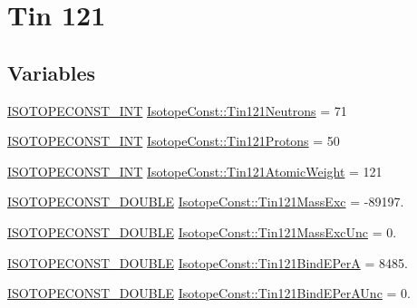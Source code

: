 \hypertarget{group___isotope_const-_tin-_sn121}{}\section{Tin 121}
\label{group___isotope_const-_tin-_sn121}
\subsection*{Variables}
\begin{DoxyCompactItemize}
\item 
\mbox{\hyperlink{group___isotope_const-_macros_ga5f18360b3e99483a35c32d789e62621c}{I\+S\+O\+T\+O\+P\+E\+C\+O\+N\+S\+T\+\_\+\+I\+NT}} \mbox{\hyperlink{group___isotope_const-_tin-_sn121_ga5b11585c595bc4a815949d5233c0fa2f}{Isotope\+Const\+::\+Tin121\+Neutrons}} = 71
\item 
\mbox{\hyperlink{group___isotope_const-_macros_ga5f18360b3e99483a35c32d789e62621c}{I\+S\+O\+T\+O\+P\+E\+C\+O\+N\+S\+T\+\_\+\+I\+NT}} \mbox{\hyperlink{group___isotope_const-_tin-_sn121_ga1c6d153b534ee6c444a997a4e7d7eef3}{Isotope\+Const\+::\+Tin121\+Protons}} = 50
\item 
\mbox{\hyperlink{group___isotope_const-_macros_ga5f18360b3e99483a35c32d789e62621c}{I\+S\+O\+T\+O\+P\+E\+C\+O\+N\+S\+T\+\_\+\+I\+NT}} \mbox{\hyperlink{group___isotope_const-_tin-_sn121_ga3f1a93f0604b4fd029fd01516d1e7829}{Isotope\+Const\+::\+Tin121\+Atomic\+Weight}} = 121
\item 
\mbox{\hyperlink{group___isotope_const-_macros_ga8f45a7272ce02c0b4c65c44636ed719a}{I\+S\+O\+T\+O\+P\+E\+C\+O\+N\+S\+T\+\_\+\+D\+O\+U\+B\+LE}} \mbox{\hyperlink{group___isotope_const-_tin-_sn121_ga8c7dbda9cd1a024a082badb1c15783b6}{Isotope\+Const\+::\+Tin121\+Mass\+Exc}} = -\/89197.
\item 
\mbox{\hyperlink{group___isotope_const-_macros_ga8f45a7272ce02c0b4c65c44636ed719a}{I\+S\+O\+T\+O\+P\+E\+C\+O\+N\+S\+T\+\_\+\+D\+O\+U\+B\+LE}} \mbox{\hyperlink{group___isotope_const-_tin-_sn121_ga15370f19140e27f5a1e0f07c290e35ee}{Isotope\+Const\+::\+Tin121\+Mass\+Exc\+Unc}} = 0.
\item 
\mbox{\hyperlink{group___isotope_const-_macros_ga8f45a7272ce02c0b4c65c44636ed719a}{I\+S\+O\+T\+O\+P\+E\+C\+O\+N\+S\+T\+\_\+\+D\+O\+U\+B\+LE}} \mbox{\hyperlink{group___isotope_const-_tin-_sn121_ga641c26001d512a9ce275715f29fa383d}{Isotope\+Const\+::\+Tin121\+Bind\+E\+PerA}} = 8485.
\item 
\mbox{\hyperlink{group___isotope_const-_macros_ga8f45a7272ce02c0b4c65c44636ed719a}{I\+S\+O\+T\+O\+P\+E\+C\+O\+N\+S\+T\+\_\+\+D\+O\+U\+B\+LE}} \mbox{\hyperlink{group___isotope_const-_tin-_sn121_ga5f3384470179188b9c4cc409ec04d17f}{Isotope\+Const\+::\+Tin121\+Bind\+E\+Per\+A\+Unc}} = 0.

\end{DoxyCompactItemize}
